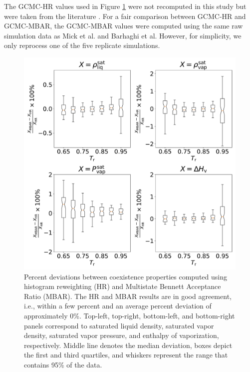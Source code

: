 \documentclass[journal=jced,manuscript=article]{achemso}
\begin{document}
The GCMC-HR values used in Figure \ref{fig:comparison MBAR HR} were not recomputed in this study but were taken from the literature \cite{Potoff_branched,Barhaghi2017}. For a fair comparison between GCMC-HR and GCMC-MBAR, the GCMC-MBAR values were computed using the same raw simulation data as Mick et al. and Barhaghi et al. However, for simplicity, we only reprocess one of the five replicate simulations.



	\begin{figure}[htb!]
		\centering
		\includegraphics[width=6.4in]{Comparison_MBAR_HR_boxplot_CI.pdf}
		\caption{Percent deviations between coexistence properties computed using histogram reweighting (HR) and Multistate Bennett Acceptance Ratio (MBAR). The HR and MBAR results are in good agreement, i.e., within a few percent and an average percent deviation of approximately 0\%. Top-left, top-right, bottom-left, and bottom-right panels correspond to saturated liquid density, saturated vapor density, saturated vapor pressure, and enthalpy of vaporization, respectively. Middle line denotes the median deviation, boxes depict the first and third quartiles, and whiskers represent the range that contains 95\% of the data.}
		\label{fig:comparison MBAR HR}
	\end{figure}
\end{document}
